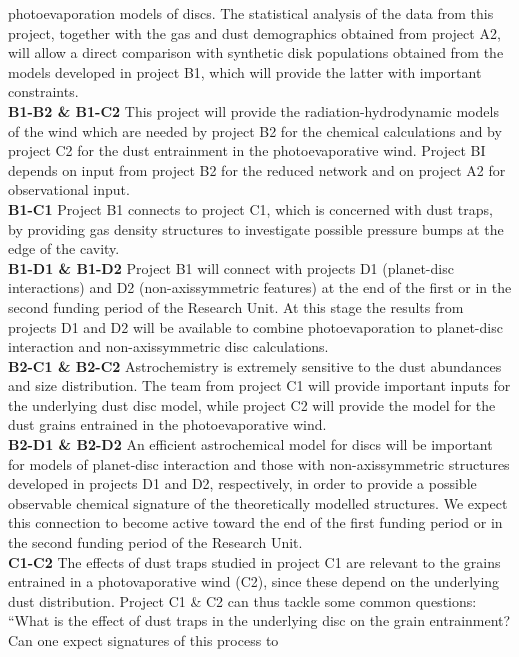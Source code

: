 \documentclass[10pt,fleqn,twoside]{article}
\begin{document}
photoevaporation models of discs. The statistical analysis of the
data from this project, together with the gas and dust demographics
obtained from project A2, will allow a direct comparison with synthetic disk
populations obtained from the models developed in project B1, which
will provide the latter with important constraints. \\
{\bf B1-B2 \&
  B1-C2} This project will provide the radiation-hydrodynamic models of the
wind which are needed by project B2 for the
chemical calculations and by project C2 for the dust
entrainment in the photoevaporative wind. Project BI depends on input
from project B2 for the 
reduced network and on project A2 for observational input. \\
{\bf B1-C1} Project B1 connects to project C1, which is concerned with
dust traps, by providing gas density structures to investigate
possible pressure bumps at the edge of the cavity. \\
{\bf B1-D1 \&
  B1-D2} Project B1 will connect with projects D1 (planet-disc
interactions) and D2 (non-axissymmetric features) at the end of
the first or in the second funding period of the Research Unit. At
this stage the results  from projects D1 and D2 will be available to
combine photoevaporation to planet-disc interaction and
non-axissymmetric disc calculations. \\
{\bf B2-C1 \& B2-C2}
Astrochemistry is extremely sensitive to the dust abundances and size
distribution. The team from 
project C1 will provide important inputs for the underlying dust disc 
model, while project C2 will provide the model for the dust
grains entrained in the photoevaporative wind. \\
{\bf B2-D1 \& B2-D2}
An efficient astrochemical model for discs will be important for models of planet-disc
interaction and those with non-axissymmetric structures developed in
projects D1 and D2, respectively, in order to provide a possible
observable chemical signature of the theoretically modelled
structures. We expect this connection to become active toward the end
of the first funding period or in the second funding period of the
Research Unit. \\
{\bf C1-C2} The effects of dust traps studied in
project C1 are relevant to the grains entrained in a photovaporative
wind (C2), since these depend on the underlying dust
distribution. Project C1 \& C2 can thus tackle some common questions: ``What is the effect of dust traps in the underlying disc
on the grain entrainment? Can one expect signatures of this process to
\end{document}
